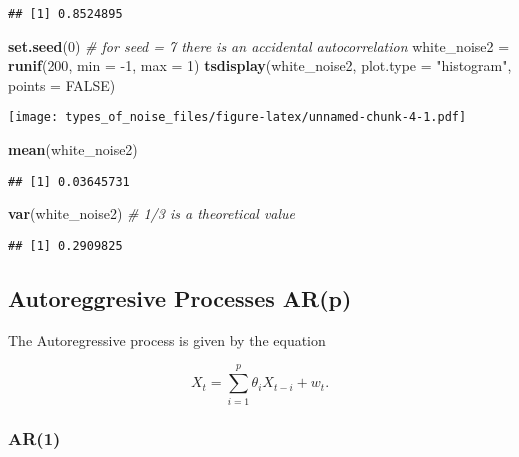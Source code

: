 \documentclass[]{article}
\newenvironment{Shaded}{\begin{snugshade}}{\end{snugshade}}
\newcommand{\CommentTok}[1]{\textcolor[rgb]{0.56,0.35,0.01}{\textit{#1}}}
\newcommand{\DataTypeTok}[1]{\textcolor[rgb]{0.13,0.29,0.53}{#1}}
\newcommand{\DecValTok}[1]{\textcolor[rgb]{0.00,0.00,0.81}{#1}}
\newcommand{\KeywordTok}[1]{\textcolor[rgb]{0.13,0.29,0.53}{\textbf{#1}}}
\newcommand{\NormalTok}[1]{#1}
\newcommand{\OtherTok}[1]{\textcolor[rgb]{0.56,0.35,0.01}{#1}}
\newcommand{\StringTok}[1]{\textcolor[rgb]{0.31,0.60,0.02}{#1}}
\begin{document}
\begin{verbatim}
## [1] 0.8524895
\end{verbatim}

\begin{Shaded}
\begin{Highlighting}[]
\KeywordTok{set.seed}\NormalTok{(}\DecValTok{0}\NormalTok{) }\CommentTok{# for seed = 7 there is an accidental autocorrelation}
\NormalTok{white_noise2 =}\StringTok{ }\KeywordTok{runif}\NormalTok{(}\DecValTok{200}\NormalTok{, }\DataTypeTok{min =} \DecValTok{-1}\NormalTok{, }\DataTypeTok{max =} \DecValTok{1}\NormalTok{)}
\KeywordTok{tsdisplay}\NormalTok{(white_noise2, }\DataTypeTok{plot.type =} \StringTok{"histogram"}\NormalTok{, }\DataTypeTok{points =} \OtherTok{FALSE}\NormalTok{)}
\end{Highlighting}
\end{Shaded}

\texttt{[image: types\_of\_noise\_files/figure-latex/unnamed-chunk-4-1.pdf]}

\begin{Shaded}
\begin{Highlighting}[]
\KeywordTok{mean}\NormalTok{(white_noise2)}
\end{Highlighting}
\end{Shaded}

\begin{verbatim}
## [1] 0.03645731
\end{verbatim}

\begin{Shaded}
\begin{Highlighting}[]
\KeywordTok{var}\NormalTok{(white_noise2) }\CommentTok{# 1/3 is a theoretical value}
\end{Highlighting}
\end{Shaded}

\begin{verbatim}
## [1] 0.2909825
\end{verbatim}

\hypertarget{autoreggresive-processes-arp}{%
\subsection{Autoreggresive Processes
AR(p)}\label{autoreggresive-processes-arp}}

The Autoregressive process is given by the equation

\[X_t = \sum^p_{i=1} \theta_i X_{t-i} + w_t.\]

\hypertarget{ar1}{%
\subsubsection{AR(1)}\label{ar1}}
\end{document}

